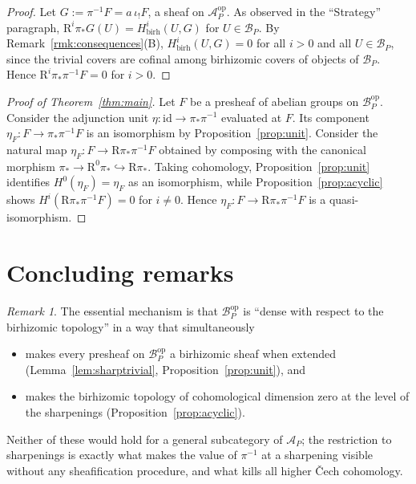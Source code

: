 \documentclass[11pt]{article}
\theoremstyle{definition}
\theoremstyle{remark}
\newtheorem{remark}[theorem]{Remark}
\newcommand{\Acal}{\mathcal{A}}
\newcommand{\Bcal}{\mathcal{B}}
\newcommand{\op}{\mathrm{op}}
\begin{document}
\begin{proof}
Let $G := \pi^{-1} F = a\,\iota_! F$, a sheaf on $\Acal_P^{\op}$.  As observed
in the ``Strategy'' paragraph, $\mathrm{R}^i \pi_* G (U) =
H^i_{\mathrm{birh}}(U, G)$ for $U \in \Bcal_P$.  By
Remark~\ref{rmk:consequences}(B), $H^i_{\mathrm{birh}}(U, G) = 0$ for all
$i > 0$ and all $U \in \Bcal_P$, since the trivial covers are cofinal among
birhizomic covers of objects of $\Bcal_P$.  Hence $\mathrm{R}^i \pi_* \pi^{-1}F
= 0$ for $i > 0$.
\end{proof}

\begin{proof}[Proof of Theorem~\ref{thm:main}]
Let $F$ be a presheaf of abelian groups on $\Bcal_P^{\op}$.  Consider the
adjunction unit $\eta : \mathrm{id} \to \pi_* \pi^{-1}$ evaluated at $F$.  Its
component $\eta_F : F \to \pi_* \pi^{-1}F$ is an isomorphism by
Proposition~\ref{prop:unit}.  Consider the natural map
$\eta_F : F \to \mathrm{R}\pi_* \pi^{-1}F$ obtained by composing with the
canonical morphism $\pi_* \to \mathrm{R}^0 \pi_* \hookrightarrow
\mathrm{R}\pi_*$.  Taking cohomology, Proposition~\ref{prop:unit} identifies
$H^0(\eta_F) = \eta_F$ as an isomorphism, while
Proposition~\ref{prop:acyclic} shows $H^i(\mathrm{R}\pi_* \pi^{-1}F) = 0$ for
$i \ne 0$.  Hence $\eta_F : F \to \mathrm{R}\pi_* \pi^{-1}F$ is a
quasi-isomorphism.
\end{proof}

\section{Concluding remarks}

\begin{remark}
The essential mechanism is that $\Bcal_P^{\op}$ is ``dense with respect to
the birhizomic topology'' in a way that simultaneously
\begin{itemize}
\item makes every presheaf on $\Bcal_P^{\op}$ a birhizomic sheaf when
      extended (Lemma~\ref{lem:sharptrivial}, Proposition~\ref{prop:unit}),
      and
\item makes the birhizomic topology of cohomological dimension zero at the
      level of the sharpenings (Proposition~\ref{prop:acyclic}).
\end{itemize}
Neither of these would hold for a general subcategory of $\Acal_P$; the
restriction to sharpenings is exactly what makes the value of $\pi^{-1}$ at
a sharpening visible without any sheafification procedure, and what kills all
higher \v{C}ech cohomology.
\end{remark}
\end{document}
